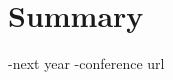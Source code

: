 \documentclass{beamer}
\begin{document}
\section*{Summary}
\begin{frame}
-next year
-conference url
\end{frame}
%
%
%
%
%
\end{document}
